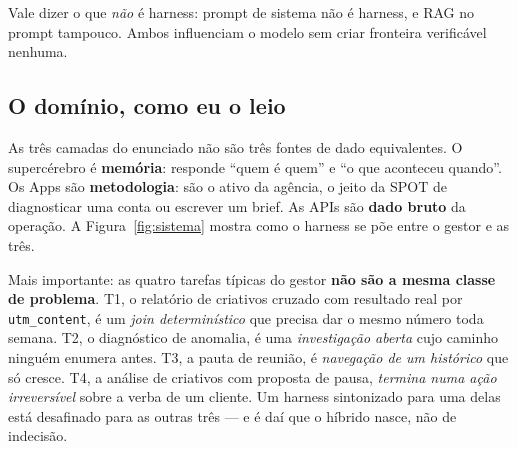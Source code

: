 \documentclass[10pt,twocolumn]{article}
\newcommand{\code}[1]{\texttt{\footnotesize #1}}
\begin{document}
Vale dizer o que \emph{não} é harness: prompt de sistema não é harness, e RAG no prompt
tampouco. Ambos influenciam o modelo sem criar fronteira verificável nenhuma.

\subsection{O domínio, como eu o leio}

As três camadas do enunciado não são três fontes de dado equivalentes. O supercérebro é
\textbf{memória}: responde ``quem é quem'' e ``o que aconteceu quando''. Os Apps são
\textbf{metodologia}: são o ativo da agência, o jeito da SPOT de diagnosticar uma conta ou
escrever um brief. As APIs são \textbf{dado bruto} da operação. A Figura~\ref{fig:sistema}
mostra como o harness se põe entre o gestor e as três.

Mais importante: as quatro tarefas típicas do gestor \textbf{não são a mesma classe de
problema}. T1, o relatório de criativos cruzado com resultado real por \code{utm\_content},
é um \emph{join determinístico} que precisa dar o mesmo número toda semana. T2, o
diagnóstico de anomalia, é uma \emph{investigação aberta} cujo caminho ninguém enumera
antes. T3, a pauta de reunião, é \emph{navegação de um histórico} que só cresce. T4, a
análise de criativos com proposta de pausa, \emph{termina numa ação irreversível} sobre a
verba de um cliente. Um harness sintonizado para uma delas está desafinado para as outras
três --- e é daí que o híbrido nasce, não de indecisão.
\end{document}
